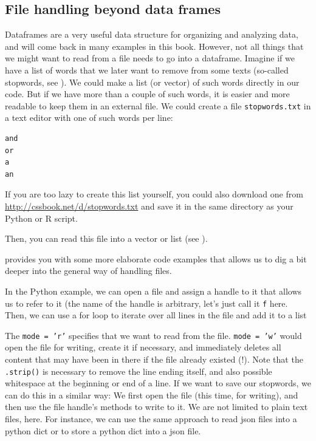 \subsection{File handling beyond data frames}
Dataframes are a very useful data structure for organizing and analyzing data, and will come back in many examples in this book.
However, not all things that we might want to read from a file needs to go into a dataframe.
Imagine if we have a list of words that we later want to remove from some texts (so-called stopwords, see ).
We could make a list (or vector) of such words directly in our code. 
But if we have more than a couple of such words, it is easier and more readable to keep them in an external file. We could create a file \texttt{stopwords.txt} in a text editor with one of such words per line:

\begin{lstlisting}
and
or
a
an
\end{lstlisting}

If you are too lazy to create this list yourself, you could also
download one from \url{http://cssbook.net/d/stopwords.txt} and save it
in the same directory as your Python or R script.

Then, you can read this file into a vector or list  (see ).



 provides you with some more elaborate code examples that allows us to dig a bit deeper into the general way of handling files.

In the Python example,  we can open a file and assign a handle to it that allows us to refer to it (the name of the handle is arbitrary, let's just call it \texttt{f} here.
Then, we can use a for loop to iterate over all lines in the file and add it to a list

The \texttt{mode = 'r'} specifies that we want to read from the file. \texttt{mode = 'w'} would open the file for writing, create it if necessary, and immediately deletes all content that may have been in there if the file already existed (!).
Note that the \texttt{.strip()} is necessary to remove the line ending itself, and also possible whitespace at the beginning or end of a line.
If we want to save our stopwords, we can do this in a similar way: We first open the file (this time, for writing), and then use the file handle's methods to write to it.
We are not limited to plain text files, here. For instance, we can use the same approach to read json files into a python dict or to store a python dict into a json file.

